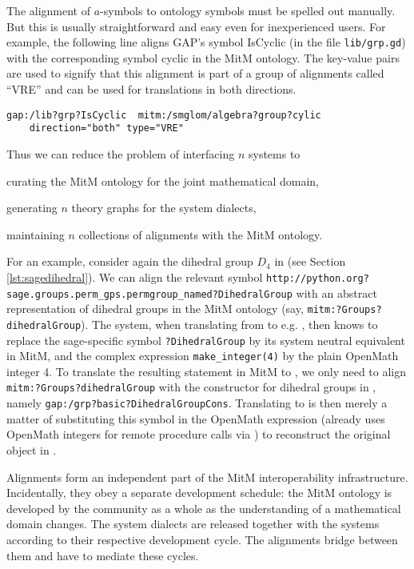 The alignment of $a$-symbols to ontology symbols must be spelled out manually.
But this is usually straightforward and easy even for inexperienced users. For example, the following line aligns GAP's symbol \textsf{IsCyclic} (in the file \lstinline|lib/grp.gd|) with the corresponding symbol \textsf{cyclic} in the MitM ontology.
The key-value pairs are used to signify that this alignment is part of a group of alignments called ``VRE'' and can be used for translations in both directions.

\begin{verbatim}
gap:/lib?grp?IsCyclic  mitm:/smglom/algebra?group?cylic
    direction="both" type="VRE"
\end{verbatim}

Thus we can reduce the problem of interfacing $n$ systems to
\begin{inparaenum}[\em i\rm)]
\item curating the MitM ontology for the joint mathematical domain,
\item generating $n$ theory graphs for the system dialects,
\item maintaining $n$ collections of alignments with the MitM ontology.
\end{inparaenum}\medskip

For an example, consider again the dihedral group $D_4$ in \Sage (see Section \ref{lst:sagedihedral}). We can align the relevant symbol 
\verb+http://python.org?sage.groups.perm_gps.permgroup_named?DihedralGroup+
with an abstract representation of dihedral groups in the MitM ontology (say, \verb+mitm:?Groups?dihedralGroup+). The \MMT system, when translating from \Sage to e.g. \GAP, then knows to replace the sage-specific symbol \verb+?DihedralGroup+ by its system neutral equivalent in MitM, and the complex expression \verb+make_integer(4)+ by the plain OpenMath integer 4. To translate the resulting statement in MitM to \GAP, we only need to align \verb+mitm:?Groups?dihedralGroup+ with the constructor for dihedral groups in \GAP, namely \verb+gap:/grp?basic?DihedralGroupCons+. Translating to \GAP is then merely a matter of substituting this symbol in the OpenMath expression (\GAP already uses OpenMath integers for remote procedure calls via \SCSCP) to reconstruct the original \Sage object in \GAP.
\medskip

Alignments form an independent part of the MitM interoperability infrastructure.
Incidentally, they obey a separate development schedule: the MitM ontology is developed by the community as a whole as the understanding of a mathematical domain changes.
The system dialects are released together with the systems according to their respective development cycle.
The alignments bridge between them and have to mediate these cycles.

